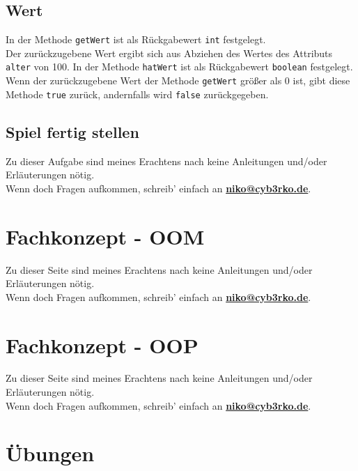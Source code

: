 \documentclass{scrartcl}   %
\begin{document}
\subsection{Wert}

\begin{itemize}
    \barrow In der Methode \texttt{getWert} ist als Rückgabewert \texttt{int} festgelegt.\\
    Der zurückzugebene Wert ergibt sich aus Abziehen des Wertes des Attributs \texttt{alter} von 100.
    \barrow In der Methode \texttt{hatWert} ist als Rückgabewert \texttt{boolean} festgelegt.\\
    Wenn der zurückzugebene Wert der Methode \texttt{getWert} größer als 0 ist, gibt diese Methode \texttt{true} zurück, andernfalls wird \texttt{false} zurückgegeben.
\end{itemize}

\subsection{Spiel fertig stellen}

Zu dieser Aufgabe sind meines Erachtens nach keine Anleitungen und/oder Erläuterungen nötig.\\
Wenn doch Fragen aufkommen, schreib' einfach an \textbf{\href{mailto:niko@cyb3rko.de}{niko@cyb3rko.de}}.

\newpage

\section{Fachkonzept - OOM}

Zu dieser Seite sind meines Erachtens nach keine Anleitungen und/oder Erläuterungen nötig.\\
Wenn doch Fragen aufkommen, schreib' einfach an \textbf{\href{mailto:niko@cyb3rko.de}{niko@cyb3rko.de}}.

\newpage

\section{Fachkonzept - OOP}

Zu dieser Seite sind meines Erachtens nach keine Anleitungen und/oder Erläuterungen nötig.\\
Wenn doch Fragen aufkommen, schreib' einfach an \textbf{\href{mailto:niko@cyb3rko.de}{niko@cyb3rko.de}}.

\newpage

\section{Übungen}
\end{document}
